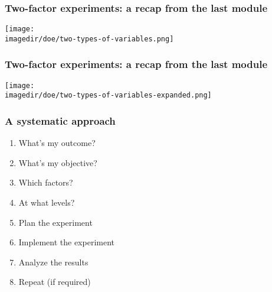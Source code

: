 \documentclass[handout,11pt,aspectratio=169,mathserif]{beamer}
\begin{document}

\begin{frame}\frametitle{Two-factor experiments: a recap from the last module}
    \texttt{[image: \\imagedir/doe/two-types-of-variables.png]}
\end{frame}

\begin{frame}\frametitle{Two-factor experiments: a recap from the last module}
    \texttt{[image: \\imagedir/doe/two-types-of-variables-expanded.png]}
\end{frame}

{
\begin{frame}\frametitle{}
	\vspace{-5cm}
\end{frame}}

\begin{frame}\frametitle{A systematic approach}
	 \begin{enumerate}
	 	\item	What's my outcome? \pause
	 	\item	What's my objective? \pause
	 	\item	Which factors? \pause
		\item	At what levels?\pause
	 	\item	Plan the experiment \pause
	 	\item	Implement the experiment\pause
	 	\item	Analyze the results\pause
		\item	Repeat (if required)
	 \end{enumerate}
	 \vspace{5cm}
\end{frame}
\end{document}
